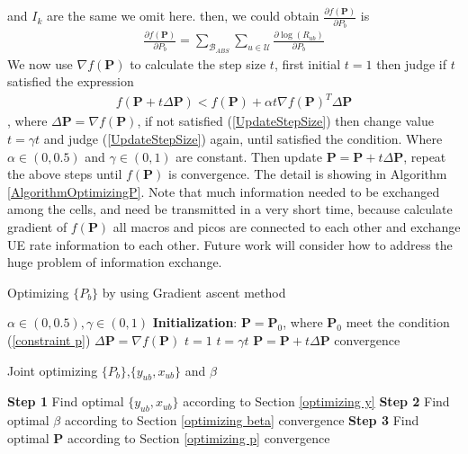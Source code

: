 \documentclass[journal]{IEEETran}
\begin{document}
and $I_k$ are the same we omit here. then, we could obtain $\frac{\partial f(\bm{P})}{\partial P_b}$ is
\begin{align}\label{GradientR}
\frac{\partial f(\bm{P})}{\partial P_b} = \sum_{\mathcal{B}_{ABS}} \sum_{u \in \mathcal{U}} \frac{\partial{\log(R_{ub})}}{\partial P_b}
\end{align}
We now use $\nabla f(\bm{P})$ to calculate the step size $t$, first initial $t = 1$ then judge if $t$ satisfied the expression
\begin{align}\label{UpdateStepSize}
f( \bm{P} + t\Delta \bm{P}) < f(\bm{P}) + \alpha t \nabla f(\bm{P})^T \Delta \bm{P}
\end{align}
, where $\Delta \bm{P} = \nabla f(\bm{P}) $, if not satisfied (\ref{UpdateStepSize}) then change value $t = \gamma t$ and judge (\ref{UpdateStepSize}) again, until satisfied the condition. Where $\alpha \in (0,0.5)$ and $\gamma \in (0,1)$ are constant. Then update $\bm{P} = \bm{P} + t\Delta \bm{P}$, repeat the above steps until $f(\bm{P})$ is convergence.  The detail is showing in Algorithm \ref{AlgorithmOptimizingP}. Note that much information needed to be exchanged among the cells, and need be transmitted in a very short time, because calculate gradient of $f(\bm{P})$ all macros and picos are connected to each other and exchange UE rate information to each other. Future work will consider how to address the huge problem of information exchange.

\begin{algorithm}
\caption{Optimizing $\{ P_b \}$ by using Gradient ascent method}
\begin{algorithmic}[1] \label{AlgorithmOptimizingP}
\ENSURE $\alpha \in (0,0.5), \gamma \in (0,1)$
\STATE \textbf{Initialization}: $\bm{P} = \bm{P}_0$, where $\bm{P}_0$ meet the condition (\ref{constraint p})
\REPEAT
\STATE $\Delta \bm{P} = \nabla f(\bm{P}) $
\STATE $t = 1$
\STATE $t = \gamma t$
\ENDWHILE
\STATE $\bm{P} = \bm{P} + t\Delta \bm{P}$
\UNTIL convergence
\end{algorithmic}
\end{algorithm}

\begin{algorithm}
\caption{Joint optimizing $\{ P_b \}$,$\{ y_{ub}, x_{ub} \}$ and $\beta$ }
\begin{algorithmic}[1] \label{A_JointAlgorithm}
\REPEAT
\REPEAT
\STATE \textbf{Step 1} Find optimal $\{ y_{ub}, x_{ub}\}$ according to Section \ref{optimizing y}
\STATE  \textbf{Step 2} Find optimal $\beta$ according to Section \ref{optimizing beta}
\UNTIL convergence
\STATE \textbf{Step 3} Find optimal $\bm{P}$ according to Section \ref{optimizing p}
\UNTIL convergence
\end{algorithmic}
\end{algorithm}
\end{document}
